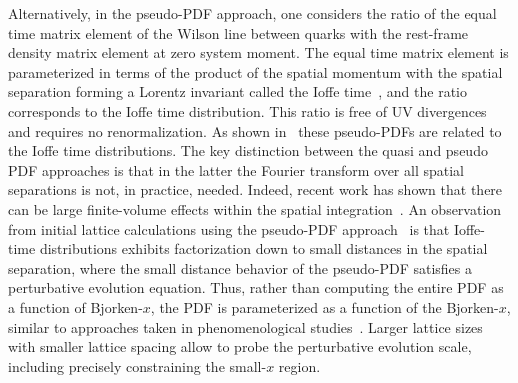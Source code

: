 Alternatively, in the pseudo-PDF approach, one considers the ratio of the equal time matrix element of the Wilson line between quarks with the rest-frame density matrix element at zero system moment. The equal time matrix element is parameterized in terms of the product of the spatial momentum with the spatial separation forming a Lorentz invariant called the Ioffe time~\cite{Ioffe:1969kf,Braun:1994jq}, and the ratio corresponds to the Ioffe time distribution.
This ratio is free of UV divergences and requires no renormalization. As shown in~\cite{Radyushkin:2016hsy,Radyushkin:2017cyf} these pseudo-PDFs are related to the Ioffe time distributions. The key distinction between the quasi and pseudo PDF approaches is that in the latter the Fourier transform over all spatial separations is not, in practice, needed. Indeed, recent work has shown that there can be large finite-volume effects within the spatial integration~\cite{Briceno:2018lfj}. An observation from initial lattice calculations using the pseudo-PDF approach~\cite{Karpie:2018zaz,Karpie:2018zaz}  is that Ioffe-time distributions exhibits factorization down to small distances in the spatial separation, where the small distance behavior of the pseudo-PDF  satisfies a perturbative  evolution equation. Thus, rather than computing the entire PDF as a function of Bjorken-$x$, the PDF is parameterized as a function of the Bjorken-$x$, similar to approaches taken in phenomenological studies~\cite{Ball:2017nwa,Accardi:2016qay}. Larger lattice sizes with smaller lattice spacing allow to probe the perturbative evolution scale, including precisely constraining the small-$x$ region.


